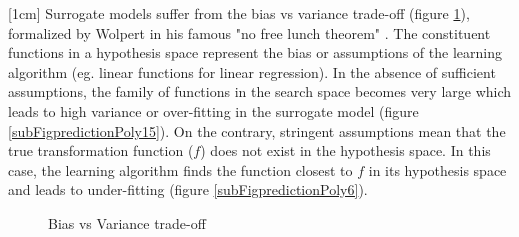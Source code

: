 [1cm]
Surrogate models suffer from the bias vs variance trade-off (figure \ref{figBiasVsVariance}), formalized by Wolpert in his famous "no free lunch theorem" \cite{wolpert1997no}. The constituent functions in a hypothesis space represent the bias or assumptions of the learning algorithm (eg. linear functions for linear regression). In the absence of sufficient assumptions, the family of functions in the search space becomes very large which leads to high variance or over-fitting in the surrogate model (figure \ref{subFigpredictionPoly15}). On the contrary, stringent assumptions mean that the true transformation function ($f$) does not exist in the hypothesis space. In this case, the learning algorithm finds the function closest to $f$ in its hypothesis space and leads to under-fitting (figure \ref{subFigpredictionPoly6}).

\begin{figure}[!ht]
  \centering
    \quad
{}\quad
  \quad
       \caption{Bias vs Variance trade-off}
       \label{figBiasVsVariance}
\end{figure}




